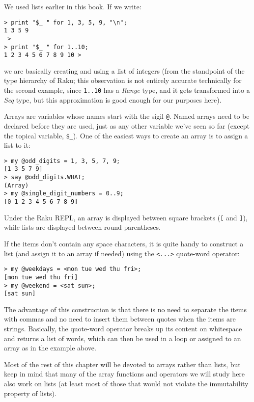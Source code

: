 We used lists earlier in this book. If we write:

\begin{verbatim}
> print "$_ " for 1, 3, 5, 9, "\n";
1 3 5 9
 >
> print "$_ " for 1..10;
1 2 3 4 5 6 7 8 9 10 >
\end{verbatim}

we are basically creating and using a list of integers (from 
the standpoint of the type hierarchy of Raku; this observation is 
not entirely accurate technically for the second example, since 
\verb'1..10' has a \emph{Range} type, and it gets 
transformed into a \emph{Seq} type, but this approximation is 
good enough for our purposes here).

Arrays are variables whose names start with the sigil \verb'@'.
Named arrays  need to be declared before they are used, just 
as any other variable we've seen so far (except the topical 
variable, \verb'$_'). One of the easiest 
ways to create an array is to assign a list to it:

\begin{verbatim}
> my @odd_digits = 1, 3, 5, 7, 9;
[1 3 5 7 9]
> say @odd_digits.WHAT;
(Array)
> my @single_digit_numbers = 0..9;
[0 1 2 3 4 5 6 7 8 9]
\end{verbatim}

Under the Raku REPL, an array is displayed between square 
brackets (\verb"[" and \verb"]"), while lists are displayed 
between round parentheses.

If the items don't contain any space characters, it is quite handy 
to construct a list (and assign it to an array if needed) using 
the \verb'<...>' quote-word operator:

\begin{verbatim}
> my @weekdays = <mon tue wed thu fri>;
[mon tue wed thu fri]
> my @weekend = <sat sun>;
[sat sun]
\end{verbatim}

The advantage of this construction is that there is no need to 
separate the items with commas and no need to insert them between 
quotes when the items are strings. Basically, 
the quote-word operator breaks up its content on whitespace 
and returns a list of words, which can then be 
used in a loop or assigned to an array as in the example 
above.

Most of the rest of this chapter will be devoted to arrays 
rather than lists, but keep in mind that many of the array 
functions and operators we will study here also work on lists 
(at least most of those that would not violate the 
immutability property of lists).
 
